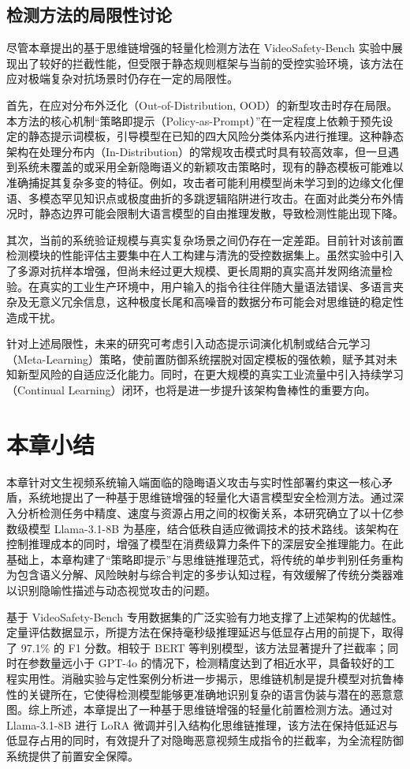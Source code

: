 \subsection{检测方法的局限性讨论}

尽管本章提出的基于思维链增强的轻量化检测方法在 VideoSafety-Bench 实验中展现出了较好的拦截性能，但受限于静态规则框架与当前的受控实验环境，该方法在应对极端复杂对抗场景时仍存在一定的局限性。

首先，在应对分布外泛化（Out-of-Distribution, OOD）的新型攻击时存在局限。本方法的核心机制“策略即提示（Policy-as-Prompt）”在一定程度上依赖于预先设定的静态提示词模板，引导模型在已知的四大风险分类体系内进行推理。这种静态架构在处理分布内（In-Distribution）的常规攻击模式时具有较高效率，但一旦遇到系统未覆盖的或采用全新隐晦语义的新颖攻击策略时，现有的静态模板可能难以准确捕捉其复杂多变的特征。例如，攻击者可能利用模型尚未学习到的边缘文化俚语、多模态罕见知识点或极度曲折的多跳逻辑陷阱进行攻击。在面对此类分布外情况时，静态边界可能会限制大语言模型的自由推理发散，导致检测性能出现下降。

其次，当前的系统验证规模与真实复杂场景之间仍存在一定差距。目前针对该前置检测模块的性能评估主要集中在人工构建与清洗的受控数据集上。虽然实验中引入了多源对抗样本增强，但尚未经过更大规模、更长周期的真实高并发网络流量检验。在真实的工业生产环境中，用户输入的指令往往伴随大量语法错误、多语言夹杂及无意义冗余信息，这种极度长尾和高噪音的数据分布可能会对思维链的稳定性造成干扰。

针对上述局限性，未来的研究可考虑引入动态提示词演化机制或结合元学习（Meta-Learning）策略，使前置防御系统摆脱对固定模板的强依赖，赋予其对未知新型风险的自适应泛化能力。同时，在更大规模的真实工业流量中引入持续学习（Continual Learning）闭环，也将是进一步提升该架构鲁棒性的重要方向。

\section{本章小结}

本章针对文生视频系统输入端面临的隐晦语义攻击与实时性部署约束这一核心矛盾，系统地提出了一种基于思维链增强的轻量化大语言模型安全检测方法。通过深入分析检测任务中精度、速度与资源占用之间的权衡关系，本研究确立了以十亿参数级模型 Llama-3.1-8B 为基座，结合低秩自适应微调技术的技术路线。该架构在控制推理成本的同时，增强了模型在消费级算力条件下的深层安全推理能力。在此基础上，本章构建了“策略即提示”与思维链推理范式，将传统的单步判别任务重构为包含语义分解、风险映射与综合判定的多步认知过程，有效缓解了传统分类器难以识别隐喻性描述与动态视觉攻击的问题。

基于 VideoSafety-Bench 专用数据集的广泛实验有力地支撑了上述架构的优越性。定量评估数据显示，所提方法在保持毫秒级推理延迟与低显存占用的前提下，取得了 97.1\% 的 F1 分数。相较于 BERT 等判别模型，该方法显著提升了拦截率；同时在参数量远小于 GPT-4o 的情况下，检测精度达到了相近水平，具备较好的工程实用性。消融实验与定性案例分析进一步揭示，思维链机制是提升模型对抗鲁棒性的关键所在，它使得检测模型能够更准确地识别复杂的语言伪装与潜在的恶意意图。综上所述，本章提出了一种基于思维链增强的轻量化前置检测方法。通过对 Llama-3.1-8B 进行 LoRA 微调并引入结构化思维链推理，该方法在保持低延迟与低显存占用的同时，有效提升了对隐晦恶意视频生成指令的拦截率，为全流程防御系统提供了前置安全保障。
